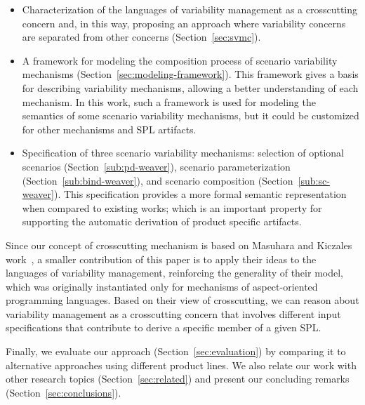\begin{itemize}
\item Characterization of the languages of variability management as a crosscutting concern and, in this way, proposing an approach where variability concerns are separated from other concerns (Section~\ref{sec:svmc}).


\item A framework for modeling the composition process of scenario variability
mechanisms (Section~\ref{sec:modeling-framework}). This framework gives a basis for describing variability mechanisms,
allowing a better understanding of each mechanism. In this work, such a framework
is used for modeling the semantics of some scenario variability mechanisms, but
it could be customized for other mechanisms and SPL artifacts.

\item Specification of three scenario variability mechanisms: selection of
optional scenarios (Section~\ref{sub:pd-weaver}), scenario parameterization (Section~\ref{sub:bind-weaver}), and scenario composition (Section~\ref{sub:sc-weaver}). This specification provides a more formal semantic
representation when compared to existing works; which is an important property for
supporting the automatic derivation of product specific artifacts.
\end{itemize}

Since our concept of crosscutting mechanism is based on Masuhara and Kiczales
work~\cite{Masuhara:2003aa}, a smaller contribution of this paper is to apply
their ideas to the languages of variability management,  reinforcing the
generality of their model, which was originally instantiated only for mechanisms
of aspect-oriented programming languages. Based on their view of crosscutting, we
can reason about variability management as a crosscutting concern that involves
different input specifications that contribute to derive a specific member of a
given SPL.

Finally, we evaluate our approach (Section~\ref{sec:evaluation}) by comparing it
to alternative approaches using different product lines. We also relate our work
with other research topics (Section~\ref{sec:related}) and present our concluding
remarks (Section~\ref{sec:conclusions}). 